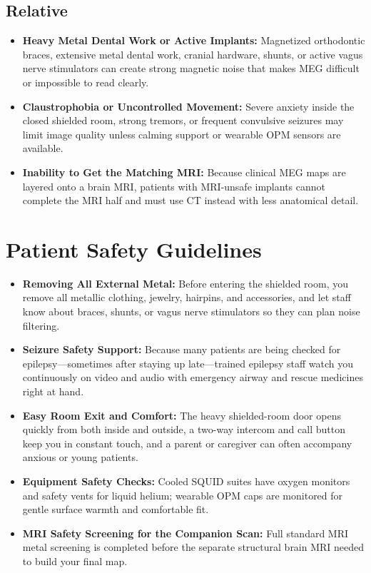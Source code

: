 \subsection{Relative}
\begin{itemize}
  \item \textbf{Heavy Metal Dental Work or Active Implants:} Magnetized orthodontic braces, extensive metal dental work, cranial hardware, shunts, or active vagus nerve stimulators can create strong magnetic noise that makes MEG difficult or impossible to read clearly.
  \item \textbf{Claustrophobia or Uncontrolled Movement:} Severe anxiety inside the closed shielded room, strong tremors, or frequent convulsive seizures may limit image quality unless calming support or wearable OPM sensors are available.
  \item \textbf{Inability to Get the Matching MRI:} Because clinical MEG maps are layered onto a brain MRI, patients with MRI-unsafe implants cannot complete the MRI half and must use CT instead with less anatomical detail.
\end{itemize}

\section{Patient Safety Guidelines}
\begin{itemize}
  \item \textbf{Removing All External Metal:} Before entering the shielded room, you remove all metallic clothing, jewelry, hairpins, and accessories, and let staff know about braces, shunts, or vagus nerve stimulators so they can plan noise filtering.
  \item \textbf{Seizure Safety Support:} Because many patients are being checked for epilepsy---sometimes after staying up late---trained epilepsy staff watch you continuously on video and audio with emergency airway and rescue medicines right at hand.
  \item \textbf{Easy Room Exit and Comfort:} The heavy shielded-room door opens quickly from both inside and outside, a two-way intercom and call button keep you in constant touch, and a parent or caregiver can often accompany anxious or young patients.
  \item \textbf{Equipment Safety Checks:} Cooled SQUID suites have oxygen monitors and safety vents for liquid helium; wearable OPM caps are monitored for gentle surface warmth and comfortable fit.
  \item \textbf{MRI Safety Screening for the Companion Scan:} Full standard MRI metal screening is completed before the separate structural brain MRI needed to build your final map.
\end{itemize}

